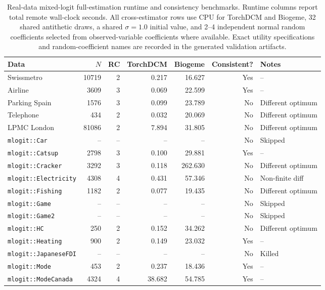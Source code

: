 {\scriptsize
\setlength{\tabcolsep}{4pt}
\begin{table}[H]
\caption{Real-data mixed-logit full-estimation runtime and consistency benchmarks. Runtime columns report total remote wall-clock seconds. All cross-estimator rows use CPU for TorchDCM and Biogeme, 32 shared antithetic draws, a shared $\sigma=1.0$ initial value, and 2--4 independent normal random coefficients selected from observed-variable coefficients where available. Exact utility specifications and random-coefficient names are recorded in the generated validation artifacts.}
\label{tab:mixed_real}
\centering
\begin{tabular}{lrrrrrl}
\toprule
Data & $N$ & RC & TorchDCM & Biogeme & Consistent? & Notes \\
\midrule
Swissmetro & 10719 & 2 & 0.217 & 16.627 & Yes & -- \\
Airline & 3609 & 3 & 0.069 & 22.599 & Yes & -- \\
Parking Spain & 1576 & 3 & 0.099 & 23.789 & No & Different optimum \\
Telephone & 434 & 2 & 0.032 & 20.069 & No & Different optimum \\
LPMC London & 81086 & 2 & 7.894 & 31.805 & No & Different optimum \\
\texttt{mlogit::Car} & -- & -- & -- & -- & No & Skipped \\
\texttt{mlogit::Catsup} & 2798 & 3 & 0.100 & 29.881 & Yes & -- \\
\texttt{mlogit::Cracker} & 3292 & 3 & 0.118 & 262.630 & No & Different optimum \\
\texttt{mlogit::Electricity} & 4308 & 4 & 0.431 & 57.346 & No & Non-finite diff \\
\texttt{mlogit::Fishing} & 1182 & 2 & 0.077 & 19.435 & No & Different optimum \\
\texttt{mlogit::Game} & -- & -- & -- & -- & No & Skipped \\
\texttt{mlogit::Game2} & -- & -- & -- & -- & No & Skipped \\
\texttt{mlogit::HC} & 250 & 2 & 0.152 & 34.262 & No & Different optimum \\
\texttt{mlogit::Heating} & 900 & 2 & 0.149 & 23.032 & Yes & -- \\
\texttt{mlogit::JapaneseFDI} & -- & -- & -- & -- & No & Killed \\
\texttt{mlogit::Mode} & 453 & 2 & 0.237 & 18.436 & Yes & -- \\
\texttt{mlogit::ModeCanada} & 4324 & 4 & 38.682 & 54.785 & Yes & -- \\

\end{tabular}
\end{table}}
